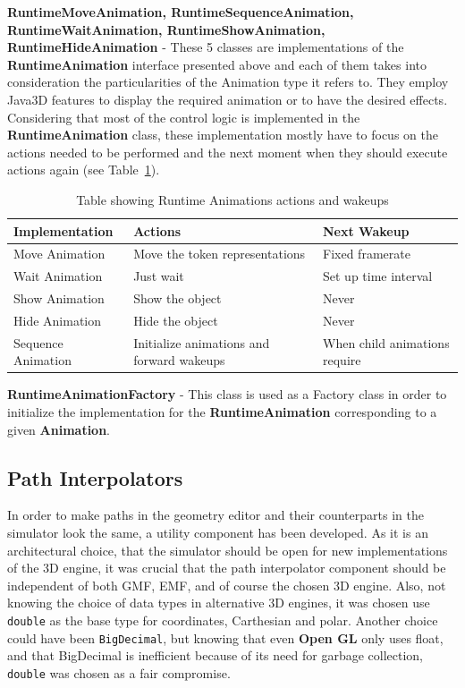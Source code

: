 \textbf{RuntimeMoveAnimation, RuntimeSequenceAnimation, RuntimeWaitAnimation, RuntimeShowAnimation,
RuntimeHideAnimation} - These 5 classes are implementations of the \textbf{RuntimeAnimation}
interface presented above and each of them takes into consideration the particularities of the
Animation type it refers to. They employ Java3D features to display the required animation or to
have the desired effects. Considering that most of the control logic is implemented in the
\textbf{RuntimeAnimation} class, these implementation mostly have to focus on the actions needed to
be performed and the next moment when they should execute actions again (see
Table~\ref{tab:runtime_animation}).

\begin{table}[ht] \centering
    \begin{tabular}{| l || l | l | } 
		\hline
		\textbf{Implementation} & \textbf{Actions} & \textbf{Next Wakeup} \\
		\hline
		Move Animation & Move the token representations & Fixed framerate \\
		Wait Animation & Just wait & Set up time interval \\
		Show Animation & Show the object & Never \\
		Hide Animation & Hide the object & Never \\
		Sequence Animation & Initialize animations and forward wakeups & When child animations require \\
		\hline
	\end{tabular}
	\caption{Table showing Runtime Animations actions and wakeups}
	\label{tab:runtime_animation}
\end{table}

\textbf{RuntimeAnimationFactory} - This class is used as a Factory class in order to initialize the
implementation for the \textbf{RuntimeAnimation} corresponding to a given \textbf{Animation}.

\subsection{Path Interpolators}

In order to make paths in the geometry editor and their counterparts in the simulator look the same,
a utility component has been developed. As it is an architectural choice, that the simulator should
be open for new implementations of the 3D engine, it was crucial that the path interpolator component
should be independent of both GMF, EMF, and of course the chosen 3D engine. Also, not knowing the 
choice of data types in alternative 3D engines, it was chosen use \texttt{double} as the base type
for coordinates, Carthesian and polar. Another choice could have been \texttt{BigDecimal}, but knowing that 
even \textbf{Open GL} only uses float, and that BigDecimal is inefficient because of its need for garbage collection,
\texttt{double} was chosen as a fair compromise.

